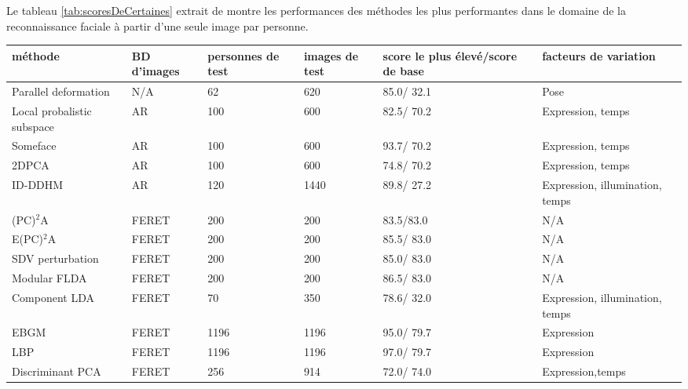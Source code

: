 Le tableau \ref{tab:scoresDeCertaines} extrait de \cite{Beymer}montre les performances des méthodes les plus performantes dans le domaine de la reconnaissance faciale à partir d'une seule image par personne.

\begin{table}[htbp]
	\centering
		\begin{tabular}{|l|p{2cm}|p{1cm}|p{1cm}|p{2cm}|p{3cm}|}
			\hline
			\footnotesize méthode&\footnotesize BD d'images& \footnotesize personnes de test&\footnotesize images de test& \footnotesize score le plus élevé/score de base& \footnotesize facteurs de variation \\ \hline
		\footnotesize Parallel deformation&\footnotesize N/A&62&620&\footnotesize 85.0/ 32.1&\footnotesize Pose\\ \hline
		\footnotesize Local probalistic subspace& \footnotesize AR&100&600&\footnotesize 82.5/ 70.2& \footnotesize Expression, temps\\ \hline
		\footnotesize Someface& \footnotesize AR&100&600&\footnotesize 93.7/ 70.2&\footnotesize Expression, temps\\ \hline
			\footnotesize 2DPCA& \footnotesize AR&100&600& \footnotesize 74.8/ 70.2&\footnotesize Expression, temps\\ \hline
			\footnotesize ID-DDHM&\footnotesize AR&120&1440&\footnotesize 89.8/ 27.2&\footnotesize Expression, illumination, temps\\ \hline
			\footnotesize (PC)$^2$A&\footnotesize FERET&200&200&\footnotesize 83.5/83.0&\footnotesize N/A\\ \hline
		\footnotesize E(PC)$^2$A&\footnotesize FERET&200&200&\footnotesize 85.5/ 83.0&\footnotesize N/A\\ \hline
		\footnotesize SDV perturbation&\footnotesize FERET&200&200&\footnotesize 85.0/ 83.0&\footnotesize N/A\\ \hline
		\footnotesize Modular FLDA&\footnotesize FERET&200&200&\footnotesize 86.5/ 83.0&\footnotesize N/A\\ \hline
		\footnotesize Component LDA&\footnotesize FERET&70&350&\footnotesize 78.6/ 32.0&\footnotesize Expression, illumination, temps\\ \hline
		\footnotesize EBGM&\footnotesize FERET&1196&1196&\footnotesize 95.0/ 79.7&\footnotesize Expression\\ \hline
		\footnotesize LBP&\footnotesize FERET&1196&1196&\footnotesize 97.0/ 79.7&\footnotesize Expression\\ \hline
		\footnotesize Discriminant PCA&\footnotesize FERET&256&914&\footnotesize 72.0/ 74.0&\footnotesize Expression,temps\\ \hline

\end{tabular}
\end{table}
